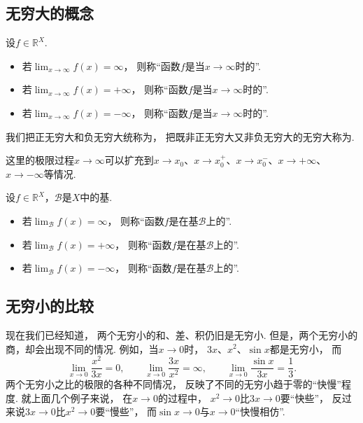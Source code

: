 \subsection{无穷大的概念}
\begin{definition}
设\(f\in\mathbb{R}^X\).
\begin{itemize}
	\item 若\(\lim_{x\to\infty} f(x) = \infty\)，
	则称“函数\(f\)是当\(x\to\infty\)时的”.

	\item 若\(\lim_{x\to\infty} f(x) = +\infty\)，
	则称“函数\(f\)是当\(x\to\infty\)时的”.

	\item 若\(\lim_{x\to\infty} f(x) = -\infty\)，
	则称“函数\(f\)是当\(x\to\infty\)时的”.
\end{itemize}
我们把正无穷大和负无穷大统称为，
把既非正无穷大又非负无穷大的无穷大称为.
\end{definition}
这里的极限过程\(x \to \infty\)可以扩充到\(x \to x_0\)、\(x \to x_0^+\)、\(x \to x_0^-\)、\(x \to +\infty\)、\(x \to -\infty\)等情况.

\begin{definition}
设\(f\in\mathbb{R}^X\)，\(\mathcal{B}\)是\(X\)中的基.
\begin{itemize}
	\item 若\(\lim_\mathcal{B} f(x) = \infty\)，
	则称“函数\(f\)是在基\(\mathcal{B}\)上的”.

	\item 若\(\lim_\mathcal{B} f(x) = +\infty\)，
	则称“函数\(f\)是在基\(\mathcal{B}\)上的”.

	\item 若\(\lim_\mathcal{B} f(x) = -\infty\)，
	则称“函数\(f\)是在基\(\mathcal{B}\)上的”.
\end{itemize}
\end{definition}

\subsection{无穷小的比较}
现在我们已经知道，
两个无穷小的和、差、积仍旧是无穷小.
但是，两个无穷小的商，却会出现不同的情况.
例如，当\(x\to0\)时，
\(3x\)、\(x^2\)、\(\sin x\)都是无穷小，
而\[
	\lim_{x\to0}\frac{x^2}{3x}=0, \qquad
	\lim_{x\to0}\frac{3x}{x^2}=\infty, \qquad
	\lim_{x\to0}\frac{\sin x}{3x}=\frac{1}{3}.
\]
两个无穷小之比的极限的各种不同情况，
反映了不同的无穷小趋于零的“快慢”程度.
就上面几个例子来说，
在\(x\to0\)的过程中，
\(x^2\to0\)比\(3x\to0\)要“快些”，
反过来说\(3x\to0\)比\(x^2\to0\)要“慢些”，
而\(\sin x\to0\)与\(x\to0\)“快慢相仿”.

